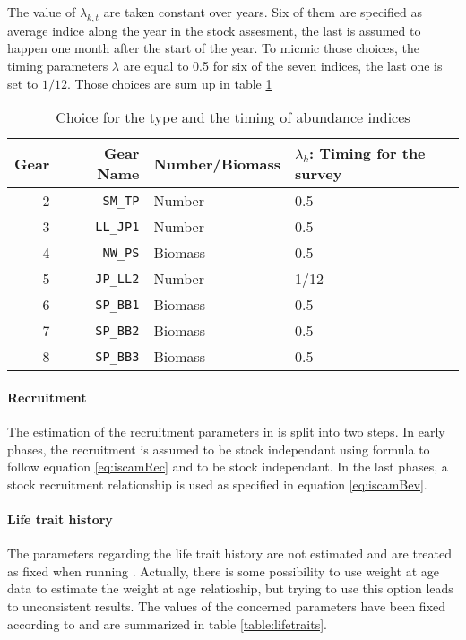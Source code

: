  
 The value of $\lambda_{k,t}$ are taken constant over years. Six of them are specified as average indice along the year in the stock assesment,
the last is assumed to happen one month after the start of the year. To micmic those choices, the timing parameters $\lambda$ are equal to 0.5 for six of the seven indices, the last one is set to $1/12$. Those choices are sum up in table \ref{table:timing} 
 
 \begin{table}[ht]
\centering
\begin{tabular}{rrp{3.5cm}p{4cm}}
  \hline
  Gear & Gear Name & Number/Biomass & $\lambda_k$: Timing for the survey\\ 
  \hline
2 & \verb+SM_TP+ & Number & 0.5 \\ 	
3 & \verb+LL_JP1+ & Number & 0.5 \\
4 & \verb+NW_PS+ & Biomass & 0.5 \\
5 & \verb+JP_LL2+ & Number & 1/12 \\
6 & \verb+SP_BB1+ & Biomass & 0.5\\
7 & \verb+SP_BB2+ & Biomass &0.5 \\
8 & \verb+SP_BB3+ & Biomass &0.5\\
\hline
\end{tabular}
\caption{Choice for the type and the timing of abundance indices}
\label{table:timing}
\end{table}
 


\paragraph{Recruitment}
The estimation of the recruitment parameters in \iscam  is split into two steps. In early phases, the recruitment is assumed to be stock independant using formula 
to follow equation \ref{eq:iscamRec} and to be stock independant. In the last phases, a stock recruitment relationship is used as specified 
in equation \ref{eq:iscamBev}. 

\paragraph{Life trait history}
The parameters regarding the life trait history are not estimated and are treated as fixed when running \iscam. Actually, there is some possibility to use weight at age data to estimate  the weight at age relatioship, but trying to use this option leads to unconsistent results.
The values of the concerned parameters have been fixed according to \cite{tuna2012} and are summarized in table \ref{table:lifetraits}.

